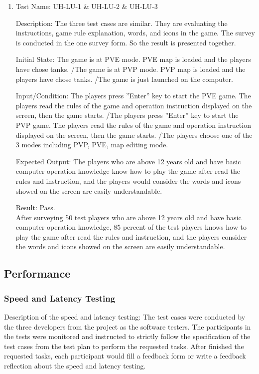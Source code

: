 \documentclass[12pt, titlepage]{article}
\begin{document}
\begin{enumerate}

\item{Test Name: UH-LU-1 \& UH-LU-2 \& UH-LU-3\\}

Description: The three test cases are similar. They are evaluating the instructions, game rule explanation, words, and icons in the game. The survey is conducted in the one survey form. So the result is presented together.

Initial State: The game is at PVE mode. PVE map is loaded and the players have chose tanks. /The game is at PVP mode. PVP map is loaded and the players have chose tanks. /The game is just launched on the computer.

Input/Condition: The players press ”Enter” key to start the PVE game. The players read the rules of the game and operation instruction displayed on the screen, then the game starts. /The players press ”Enter” key to start the PVP game. The players read the rules of the game and operation instruction displayed on the screen, then the game starts. /The players choose one of the 3 modes including PVP, PVE, map editing mode.

Expected Output: The players who are above 12 years old and have basic computer operation knowledge know how to play the game after read the rules and instruction, and the players would consider the words and icons showed on the screen are easily understandable.

Result: Pass. \\After surveying 50 test players who are above 12 years old and have basic computer operation knowledge, 85 percent of the test players knows how to play the game after read the rules and instruction, and the players consider the words and icons showed on the screen are easily understandable.

\end{enumerate}

\subsection{Performance}
\subsubsection{Speed and Latency Testing}
Description of the speed and latency testing: The test cases were conducted by the three developers from the project as the software testers. The participants in the tests were monitored and instructed to strictly follow the specification of the test cases from the test plan to perform the requested tasks. After finished the requested tasks, each participant would fill a feedback form or write a feedback reflection about the speed and latency testing.
\end{document}
